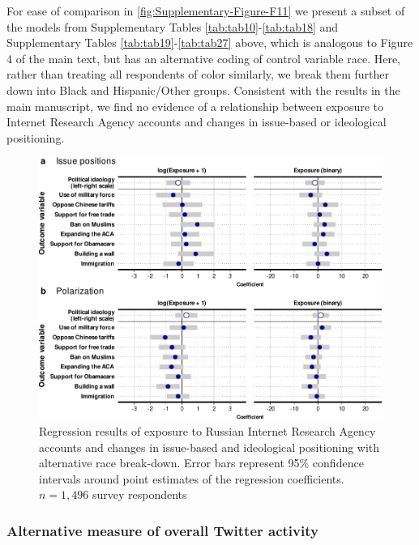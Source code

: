 \documentclass[
  12pt,
]{article}
\begin{document}
For ease of comparison in \autoref{fig:Supplementary-Figure-F11} we present a subset of the models from Supplementary Tables \ref{tab:tab10}-\ref{tab:tab18} and Supplementary Tables \ref{tab:tab19}-\ref{tab:tab27} above, which is analogous to Figure 4 of the main text, but has an alternative coding of control variable race. Here, rather than treating all respondents of color similarly, we break them further down into Black and Hispanic/Other groups. Consistent with the results in the main manuscript, we find no evidence of a relationship between exposure to Internet Research Agency accounts and changes in issue-based or ideological positioning.

\begin{figure}
\centering
\includegraphics{Supplementary_Information_files/figure-latex/Supplementary-Figure-F11-1.pdf}
\caption{\label{fig:Supplementary-Figure-F11}Regression results of exposure to Russian Internet Research Agency accounts and changes in issue-based and ideological positioning with alternative race break-down. Error bars represent 95\% confidence intervals around point estimates of the regression coefficients. \(n = 1,496\) survey respondents}
\end{figure}

\clearpage

\hypertarget{alternative-measure-of-overall-twitter-activity-1}{%
\subsubsection{Alternative measure of overall Twitter activity}\label{alternative-measure-of-overall-twitter-activity-1}}
\end{document}
